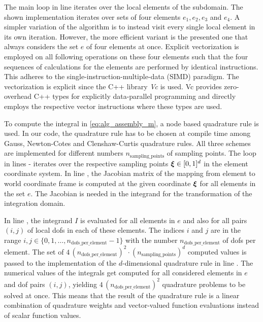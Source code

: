 The main loop in line  iterates over the local elements of the subdomain. 
The shown implementation iterates over sets of four elements $e_1,e_2,e_3$ and $e_4$. A simpler variation of the algorithm is to instead visit every single local element in its own iteration.
However, the more efficient variant is the presented one that always considers the set $e$ of four elements at once. 
Explicit vectorization is employed on all following operations on these four elements such that 
the four sequences of calculations for the elements are performed by identical instructions. This adheres to the single-instruction-multiple-data (SIMD) paradigm. The vectorization is explicit since the C++ library \emph{Vc} \cite{Kretz2012,Kretz2015} is used. Vc provides zero-overhead C++ types for explicitly data-parallel programming and directly employs the respective vector instructions where these types are used.

To compute the integral in \cref{eq:alg_assembly_m}, a node based quadrature rule is used. In our code, the quadrature rule has to be chosen at compile time among Gauss, Newton-Cotes and Clenshaw-Curtis quadrature rules. All three schemes are implemented for different numbers $n_\text{sampling\_points}$ of sampling points. The loop in lines  -  iterates over the respective sampling points $\boldsymbol{\xi} \in [0,1]^d$ in the element coordinate system. In line , the Jacobian matrix of the mapping from element to world coordinate frame is computed at the given coordinate $\boldsymbol{\xi}$ for all elements in the set $e$. The Jacobian is needed in the integrand for the transformation of the integration domain.

In line , the integrand $I$ is evaluated for all elements in $e$ and also for all pairs $(i,j)$ of local dofs in each of these elements. The indices $i$ and $j$ are in the range $i,j \in \{0,1,\dots,n_\text{dofs\_per\_element}-1\}$ with the number $n_\text{dofs\_per\_element}$ of dofs per element. The set of $4\,(n_\text{dofs\_per\_element})^2\cdot (n_\text{sampling\_points})^d$ computed values is passed to the implementation of the $d$-dimensional quadrature rule in line . The numerical values of the integrals get computed for all considered elements in $e$ and dof pairs $(i,j)$, yielding $4\,(n_\text{dofs\_per\_element})^2$ quadrature problems to be solved at once. This means that the result of the quadrature rule is a linear combination of quadrature weights and vector-valued function evaluations instead of scalar function values.


